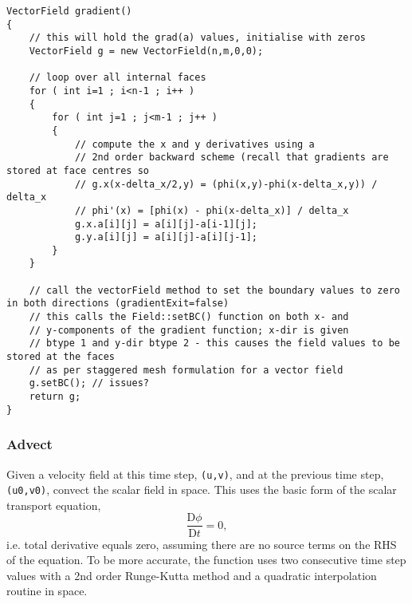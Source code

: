 \documentclass[notitlepage]{article}
\begin{document}
\begin{lstlisting}[style=myCpp]
VectorField gradient()
{
	// this will hold the grad(a) values, initialise with zeros
	VectorField g = new VectorField(n,m,0,0);
	
	// loop over all internal faces
	for ( int i=1 ; i<n-1 ; i++ )
	{
		for ( int j=1 ; j<m-1 ; j++ )
		{
			// compute the x and y derivatives using a
			// 2nd order backward scheme (recall that gradients are stored at face centres so
			// g.x(x-delta_x/2,y) = (phi(x,y)-phi(x-delta_x,y)) / delta_x
			// phi'(x) = [phi(x) - phi(x-delta_x)] / delta_x
			g.x.a[i][j] = a[i][j]-a[i-1][j];
			g.y.a[i][j] = a[i][j]-a[i][j-1];
		}
	}
	
	// call the vectorField method to set the boundary values to zero in both directions (gradientExit=false)
	// this calls the Field::setBC() function on both x- and
	// y-components of the gradient function; x-dir is given
	// btype 1 and y-dir btype 2 - this causes the field values to be stored at the faces
	// as per staggered mesh formulation for a vector field
	g.setBC(); // issues?
	return g;
}
\end{lstlisting}

\subsubsection{Advect}

Given a velocity field at this time step, \texttt{(u,v)}, and at the previous time step,
\texttt{(u0,v0)}, convect the scalar field in space. This uses the basic form of the scalar
transport equation,
%
\begin{equation}
\frac{\mathrm{D} \phi}{\mathrm{D}t} = 0,
\end{equation}
%
i.e. total derivative equals zero, assuming there are no
source terms on the RHS of the equation. To be more accurate, the function uses
two consecutive time step values with a 2nd order Runge-Kutta method and a
quadratic interpolation routine in space.
\end{document}
